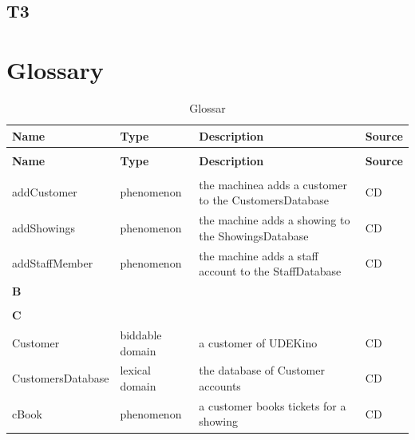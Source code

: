 \documentclass[a4paper,10pt,titlepage,bibtotoc,bibtotocnumbered]{scrreprt}
\begin{document}
\section{T3}




\chapter{Glossary}

\begin{longtable}{|l|l|p{5cm}|l|}
\caption{Glossary} 
\label{table:glossar}\\ 
\hline
\rowcolor{black!25}\textbf{Name} & \textbf{Type} & \textbf{Description} & \textbf{Source}\\
\hline
\endfirsthead
\caption[]{Glossar}\\ 
\hline
\rowcolor{black!25}\textbf{Name} & \textbf{Type} & \textbf{Description} & \textbf{Source}\\
\endhead
\hline
\endfoot
\multicolumn{4}{|l|}{\textbf{A}}\\
\hline
addCustomer & phenomenon & the machinea adds a customer to the CustomersDatabase & CD\\
\hline
addShowings & phenomenon & the machine adds a showing to the ShowingsDatabase & CD\\
\hline
addStaffMember & phenomenon & the machine adds a staff account to the StaffDatabase & CD\\
\hline
\multicolumn{4}{|l|}{\textbf{B}}\\
\hline
&  &  & \\
\hline
\multicolumn{4}{|l|}{\textbf{C}}\\
\hline
Customer & biddable domain & a customer of UDEKino & CD\\
\hline
CustomersDatabase & lexical domain & the database of Customer accounts & CD\\
\hline
cBook & phenomenon & a customer books tickets for a showing & CD\\

\end{longtable}
\end{document}
